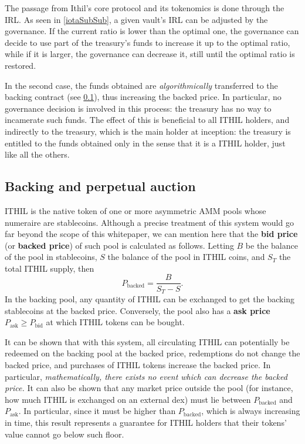 \documentclass[a4paper,10 pt]{article}
\theoremstyle{definition}
\begin{document}
The passage from Ithil's core protocol and its tokenomics is done through the IRL. As seen in \ref{iotaSubSub}, a given vault's IRL can be adjusted by the governance. If the current ratio is lower than the optimal one, the governance can decide to use part of the treasury's funds to increase it up to the optimal ratio, while if it is larger, the governance can decrease it, still until the optimal ratio is restored.

In the second case, the funds obtained are {\it algorithmically} transferred to the backing contract (see \ref{bpaSub}), thus increasing the backed price. In particular, no governance decision is involved in this process: the treasury has no way to incamerate such funds. The effect of this is beneficial to all ITHIL holders, and indirectly to the treasury, which is the main holder at inception: the treasury is entitled to the funds obtained only in the sense that it is a ITHIL holder, just like all the others.

\subsection{Backing and perpetual auction}\label{bpaSub}

ITHIL is the native token of one or more asymmetric AMM pools whose numeraire are stablecoins. Although a precise treatment of this system would go far beyond the scope of this whitepaper, we can mention here that the {\bf bid price} (or {\bf backed price}) of such pool is calculated as follows. Letting $B$ be the balance of the pool in stablecoins, $S$ the balance of the pool in ITHIL coins, and $S_T$ the total ITHIL supply, then
\begin{equation}\label{backedprice}
P_\text{backed} = \frac{B}{S_T-S}.
\end{equation}
In the backing pool, any quantity of ITHIL can be exchanged to get the backing stablecoins at the backed price. Conversely, the pool also has a {\bf ask price} $P_{\text{ask}} \ge P_{\text{bid}}$ at which ITHIL tokens can be bought.

It can be shown that with this system, all circulating ITHIL can potentially be redeemed on the backing pool at the backed price, redemptions do not change the backed price, and purchases of ITHIL tokens increase the backed price. In particular, {\it mathematically, there exists no event which can decrease the backed price.} It can also be shown that any market price outside the pool (for instance, how much ITHIL is exchanged on an external dex) must lie between $P_\text{backed}$ and $P_\text{ask}$. In particular, since it must be higher than $P_{\text{backed}}$, which is always increasing in time, this result represents a guarantee for ITHIL holders that their tokens' value cannot go below such floor.
\end{document}
